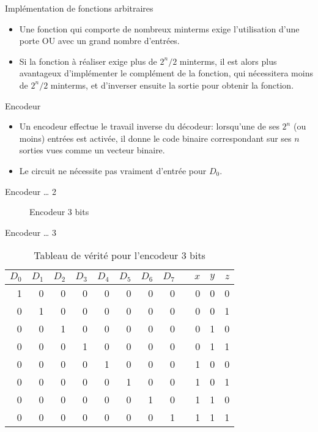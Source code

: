 \documentclass[presentation]{beamer}
\begin{document}
\begin{frame}[label={sec:orge089494}]{Implémentation de fonctions arbitraires}
\begin{itemize}
\item Une fonction qui comporte de nombreux minterms exige l'utilisation d'une porte OU avec un grand nombre d'entrées.

\item Si la fonction à réaliser exige plus de \(2^n/2\) minterms, il est alors plus avantageux d'implémenter le complément de la fonction, qui nécessitera moins de \(2^n/2\) minterms, et d'inverser ensuite la sortie pour obtenir la fonction.
\end{itemize}
\end{frame}

\begin{frame}[label={sec:org81e1086}]{Encodeur}
\begin{itemize}
\item Un encodeur effectue le travail inverse du décodeur: lorsqu'une de ses \(2^n\) (ou moins) entrées est activée, il donne le code binaire correspondant sur ses \(n\) sorties vues comme un vecteur binaire.

\item Le circuit ne nécessite pas vraiment d'entrée pour \(D_0\).
\end{itemize}
\end{frame}

\begin{frame}[label={sec:org474e4ae}]{Encodeur \ldots{} 2}
\begin{figure}[htbp]
\centering

\caption{\label{fig:org09f7b27}Encodeur 3 bits}
\end{figure}
\end{frame}

\begin{frame}[label={sec:org714e556}]{Encodeur \ldots{} 3}
\begin{table}[htbp]
\caption{\label{tab:orga117505}Tableau de vérité pour l'encodeur 3 bits}
\centering
\begin{tabular}{rrrrrrrrlrrr}
\(D_0\) & \(D_1\) & \(D_2\) & \(D_3\) & \(D_4\) & \(D_5\) & \(D_6\) & \(D_7\) &  & \(x\) & \(y\) & \(z\)\\
\hline
1 & 0 & 0 & 0 & 0 & 0 & 0 & 0 &  & 0 & 0 & 0\\
0 & 1 & 0 & 0 & 0 & 0 & 0 & 0 &  & 0 & 0 & 1\\
0 & 0 & 1 & 0 & 0 & 0 & 0 & 0 &  & 0 & 1 & 0\\
0 & 0 & 0 & 1 & 0 & 0 & 0 & 0 &  & 0 & 1 & 1\\
0 & 0 & 0 & 0 & 1 & 0 & 0 & 0 &  & 1 & 0 & 0\\
0 & 0 & 0 & 0 & 0 & 1 & 0 & 0 &  & 1 & 0 & 1\\
0 & 0 & 0 & 0 & 0 & 0 & 1 & 0 &  & 1 & 1 & 0\\
0 & 0 & 0 & 0 & 0 & 0 & 0 & 1 &  & 1 & 1 & 1\\
\end{tabular}
\end{table}
\end{frame}
\end{document}
